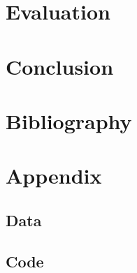 \documentclass[a4paper, 11pt]{scrartcl}
\begin{document}
\section{Evaluation}


\section{Conclusion}


\section{Bibliography}


\section{Appendix}

\subsection{Data}

\subsection{Code}
\end{document}
